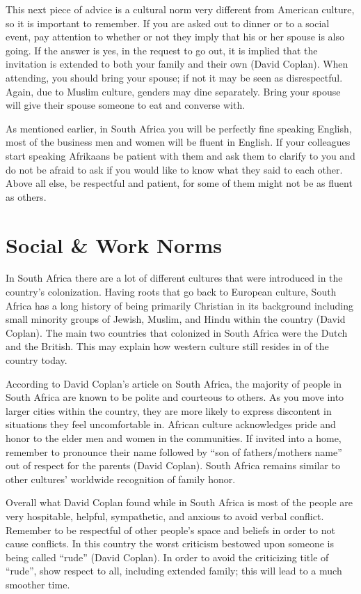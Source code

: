 \documentclass[11pt,a4paper,twoside]{report}
\begin{document}
This next piece of advice is a cultural norm very different from American
culture, so it is important to remember. If you are asked out to dinner or to a
social event, pay attention to whether or not they imply that his or her spouse
is also going. If the answer is yes, in the request to go out, it is implied
that the invitation is extended to both your family and their own (David
Coplan). When attending, you should bring your spouse; if not it may be seen as
disrespectful. Again, due to Muslim culture, genders may dine separately. Bring
your spouse will give their spouse someone to eat and converse with.

As mentioned earlier, in South Africa you will be perfectly fine speaking
English, most of the business men and women will be fluent in English. If your
colleagues start speaking Afrikaans be patient with them and ask them to
clarify to you and do not be afraid to ask if you would like to know what they
said to each other. Above all else, be respectful and patient, for some of them
might not be as fluent as others.

\section{Social \& Work Norms}

In South Africa there are a lot of different cultures that were introduced in
the country’s colonization. Having roots that go back to European culture,
South Africa has a long history of being primarily Christian in its background
including small minority groups of Jewish, Muslim, and Hindu within the country
(David Coplan). The main two countries that colonized in South Africa were the
Dutch and the British. This may explain how western culture still resides in of
the country today.


According to David Coplan’s article on South Africa, the majority of people in
South Africa are known to be polite and courteous to others. As you move into
larger cities within the country, they are more likely to express discontent in
situations they feel uncomfortable in. African culture acknowledges pride and
honor to the elder men and women in the communities. If invited into a home,
remember to pronounce their name followed by “son of fathers/mothers name” out
of respect for the parents (David Coplan). South Africa remains similar to
other cultures’ worldwide recognition of family honor.


Overall what David Coplan found while in South Africa is most of the people are
very hospitable, helpful, sympathetic, and anxious to avoid verbal conflict.
Remember to be respectful of other people’s space and beliefs in order to not
cause conflicts. In this country the worst criticism bestowed upon someone is
being called “rude” (David Coplan).  In order to avoid the criticizing title of
“rude”, show respect to all, including extended family; this will lead to a
much smoother time.
\end{document}
